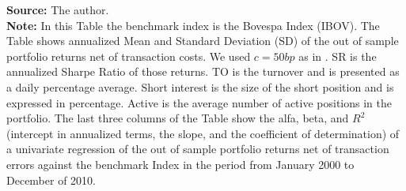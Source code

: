 \documentclass[12pt,oneside,a4paper]{memoir}
\begin{document}
\begin{table}[!ht]
\begin{threeparttable}
\begin{tablenotes} 
\textbf{Source:} The author. \\
\textbf{Note:}
In this Table the benchmark index is the Bovespa Index (IBOV).
The Table shows annualized Mean and Standard Deviation (SD) of the out of sample portfolio returns net of transaction costs.
We used $c=50bp$ as in .
SR is the annualized Sharpe Ratio of those returns.
TO is the turnover and is presented as a daily percentage average.
Short interest is the size of the short position and is expressed in percentage.
Active is the average number of active positions in the portfolio.
The last three columns of the Table show the alfa, beta, and $R^2$ (intercept in annualized terms, the slope, and the coefficient of determination) of a univariate regression of the out of sample portfolio returns net of transaction errors against the benchmark Index in the period from January 2000 to December of 2010.
\end{tablenotes} 

\end{threeparttable}
\end{table} 

\clearpage
\end{document}
